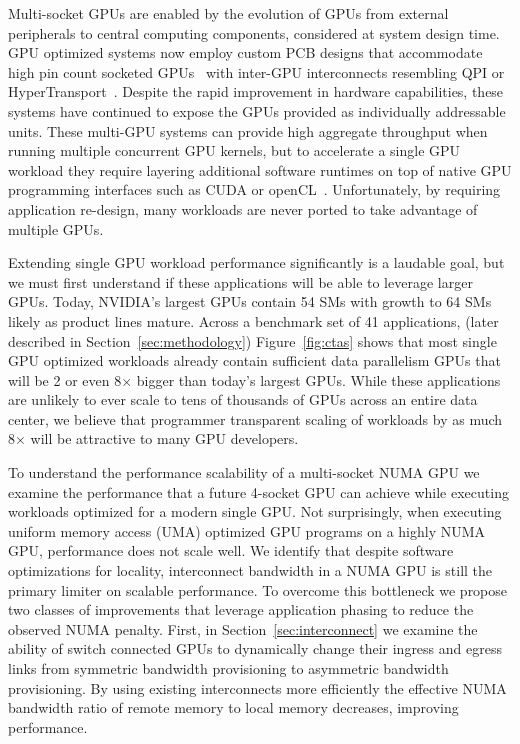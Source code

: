 Multi-socket GPUs are enabled by the evolution of GPUs from external
peripherals to central computing components, considered at system design time.  
GPU optimized systems now employ custom PCB designs that accommodate 
high pin count socketed GPUs~\cite{dgx} with inter-GPU interconnects resembling 
QPI or HyperTransport~\cite{NVLINK,INTELQPI,AMDHT}.  Despite the rapid 
improvement in hardware capabilities, these systems have 
continued to expose the GPUs provided as individually addressable units. These
multi-GPU systems can provide high aggregate throughput when running multiple concurrent
GPU kernels, but to accelerate a single GPU workload they
require layering additional software runtimes on top of native GPU programming 
interfaces such as CUDA or openCL~\cite{CUDA,OPENCL}. Unfortunately, by requiring
application re-design, many workloads are never ported to take advantage
of multiple GPUs.

Extending single GPU workload performance significantly is a laudable
goal, but we must first understand if these applications will be able to leverage
larger GPUs.  Today, NVIDIA's largest GPUs contain 54 SMs with growth to 64 SMs
likely as product lines mature. Across a benchmark set of 41 applications,
(later described in Section~\ref{sec:methodology})
Figure~\ref{fig:ctas} shows that most single GPU optimized workloads already
contain sufficient data parallelism GPUs that will be 2 or even 8$\times$ bigger 
than today's largest GPUs.  While these applications are unlikely to ever scale to tens
of thousands of GPUs across an entire data center, we believe that programmer
transparent scaling of workloads by as much 8$\times$ will
be attractive to many GPU developers.

To understand the performance scalability of a multi-socket NUMA GPU we examine 
the performance that a future 4-socket GPU can achieve while executing 
workloads optimized for a modern single GPU. Not surprisingly, when executing 
uniform memory access (UMA) optimized GPU programs on a highly NUMA GPU, 
performance does not scale well.  We identify that despite software 
optimizations for locality, interconnect bandwidth in a NUMA GPU is still the 
primary limiter on scalable performance.  To overcome this bottleneck we propose 
two classes of improvements that leverage application phasing to reduce the 
observed NUMA penalty.  First, in Section~\ref{sec:interconnect} we examine the 
ability of switch connected GPUs to dynamically change their ingress and egress 
links from symmetric bandwidth provisioning to asymmetric bandwidth 
provisioning.  By using existing interconnects more efficiently the effective 
NUMA bandwidth ratio of remote memory to local memory decreases, improving 
performance.

